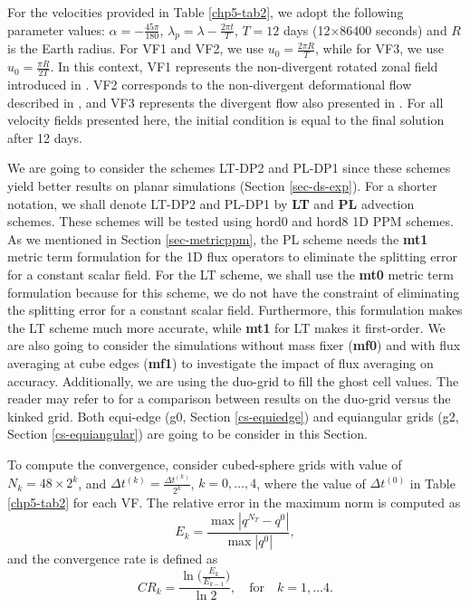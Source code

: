 For the velocities provided in Table \ref{chp5-tab2}, we adopt the following parameter values: 
$\alpha=-\frac{45\pi}{180}$, $\lambda_p=\lambda-\frac{2\pi t}{T}$, $T=12$ days (12$\times$86400 seconds) and $R$ is the Earth radius.
For VF1 and VF2, we use $u_0 = \frac{2\pi R}{T}$, while for VF3, we use $u_0 = \frac{\pi R}{2T}$.
In this context, VF1 represents the non-divergent rotated zonal field introduced in \citet{will:1992}.
VF2 corresponds to the non-divergent deformational flow described in \citet{nair:2010},
and VF3 represents the divergent flow also presented in \citet{nair:2010}.
For all velocity fields presented here, the initial condition is equal to the final solution after 12 days.

We are going to consider the schemes LT-DP2 and PL-DP1 since these schemes yield better results on planar simulations (Section \ref{sec-ds-exp}).
For a shorter notation, we shall denote LT-DP2 and PL-DP1 by \textbf{LT} and \textbf{PL} advection schemes. 
These schemes will be tested using hord0 and hord8 1D PPM schemes.
As we mentioned in Section \ref{sec-metricppm}, the PL scheme needs the \textbf{mt1} 
metric term formulation for the 1D flux operators to eliminate the splitting error for a constant scalar field.
For the LT scheme, we shall use the \textbf{mt0} metric term formulation because for this scheme, 
we do not have the constraint of eliminating the splitting error for a constant scalar field. 
Furthermore, this formulation makes the LT scheme much more accurate, while \textbf{mt1} for LT makes it first-order.
We are also going to consider the simulations without mass fixer (\textbf{mf0}) and with flux averaging at
cube edges (\textbf{mf1}) to investigate the impact of flux averaging on accuracy.
Additionally, we are using the duo-grid to fill the ghost cell values.
The reader may refer to \citet{mouallem:2023} for a comparison between results on the duo-grid versus the kinked grid.
Both equi-edge (g0, Section \ref{cs-equiedge}) and equiangular grids (g2, Section \ref{cs-equiangular}) are going to be consider in this Section.

To compute the convergence, consider cubed-sphere grids with value of $N_k =  48\times2^{k}$,
and $\Delta t^{(k)} = \frac{\Delta t^{(k)}}{2^k}$, $k=0, \ldots, 4$, where
the value of $\Delta t^{(0)}$ in Table \ref{chp5-tab2} for each VF.
The relative error in the maximum norm is computed as
\begin{equation}
	E_k = \frac{\max |q^{N_T} - q^0|}{\max {|q^0|}},
\end{equation}
and the convergence rate is defined as
\begin{equation*}
	CR_k = \frac{\ln{\bigg(\frac{E_{k}}{E_{k-1}}}\bigg)}{\ln 2}, \quad \text{for} \quad k = 1, \ldots 4.
\end{equation*}

